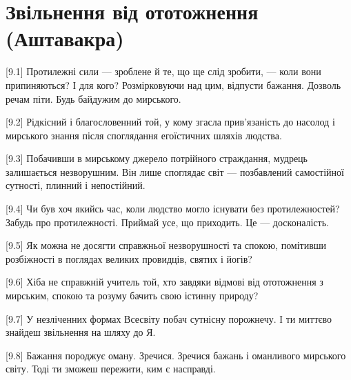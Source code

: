 \chapter[Аштавакра]{Звільнення від ототожнення (Аштавакра)}

[9.1] Протилежні сили --- зроблене й те, що ще слід зробити, --- коли вони припиняються? І для кого? Розмірковуючи над цим, відпусти бажання. Дозволь речам піти. Будь байдужим до мирського.

[9.2] Рідкісний і благословенний той, у кому згасла прив'язаність до насолод і мирського знання після споглядання егоїстичних шляхів людства.

[9.3] Побачивши в мирському джерело потрійного страждання, мудрець залишається незворушним. Він лише споглядає світ --- позбавлений самостійної сутності, плинний і непостійний.

[9.4] Чи був хоч якийсь час, коли людство могло існувати без протилежностей? Забудь про протилежності. Приймай усе, що приходить. Це --- досконалість.

[9.5] Як можна не досягти справжньої незворушності та спокою, помітивши розбіжності в поглядах великих провидців, святих і йогів?

[9.6] Хіба не справжній учитель той, хто завдяки відмові від ототожнення з мирським, спокою та розуму бачить свою істинну природу?

[9.7] У незліченних формах Всесвіту побач сутнісну порожнечу. І ти миттєво знайдеш звільнення на шляху до Я.

[9.8] Бажання породжує оману. Зречися. Зречися бажань і оманливого мирського світу. Тоді ти зможеш пережити, ким є насправді.
